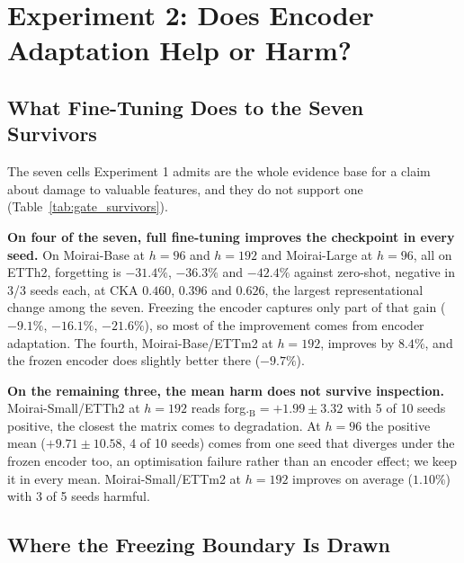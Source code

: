 \section{Experiment 2: Does Encoder Adaptation Help or Harm?}
\label{sec:exp2}

\subsection{What Fine-Tuning Does to the Seven Survivors}
\label{sec:forecasting:results}

The seven cells Experiment 1 admits are the whole evidence base for a claim about
damage to valuable features, and they do not support one
(Table~\ref{tab:gate_survivors}).

\textbf{On four of the seven, full fine-tuning improves the checkpoint in every
seed.}  On Moirai-Base at $h{=}96$ and $h{=}192$ and Moirai-Large at $h{=}96$, all
on ETTh2, forgetting is $-31.4\%$, $-36.3\%$ and $-42.4\%$ against zero-shot,
negative in 3/3 seeds each, at CKA $0.460$, $0.396$ and $0.626$, the largest
representational change among the seven.  Freezing the encoder captures only part
of that gain ($-9.1\%$, $-16.1\%$, $-21.6\%$), so most of the improvement comes
from encoder adaptation.  The fourth, Moirai-Base/ETTm2 at $h{=}192$, improves by
$8.4\%$, and the frozen encoder does slightly better there ($-9.7\%$).

\textbf{On the remaining three, the mean harm does not survive inspection.}
Moirai-Small/ETTh2 at $h{=}192$ reads forg.$_\text{B}{=}{+}1.99{\pm}3.32$ with 5 of
10 seeds positive, the closest the matrix comes to degradation.  At $h{=}96$ the
positive mean ($+9.71{\pm}10.58$, 4 of 10 seeds) comes from one seed that diverges
under the frozen encoder too, an optimisation failure rather than an encoder
effect; we keep it in every mean.  Moirai-Small/ETTm2 at $h{=}192$ improves on
average ($1.10\%$) with 3 of 5 seeds harmful.

\subsection{Where the Freezing Boundary Is Drawn}
\label{sec:exp2:strict}

